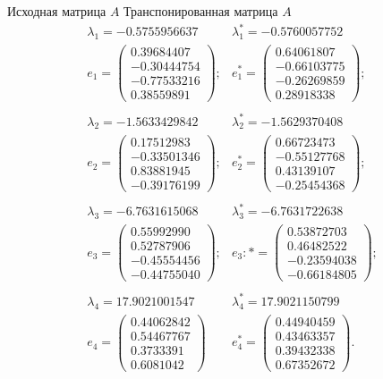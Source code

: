 \documentclass[12pt, a4paper]{article}
\begin{document}
	\newpage
		\qquad \qquad \qquad Исходная матрица $A$ \qquad Транспонированная матрица $A$ 
			\begin{eqnarray*}
			\lambda_1 = -0.5755956637   & \lambda_1^*=-0.5760057752\\
			e_1 = \begin{pmatrix}
				0.39684407\\ -0.30444754\\ -0.77533216\\0.38559891
			\end{pmatrix}; & e_1^* = \begin{pmatrix}
			0.64061807\\-0.66103775\\ -0.26269859\\ 0.28918338
		\end{pmatrix}; \\\\
			\lambda_2 = -1.5633429842  & \lambda_2^*=-1.5629370408\\
			  e_2 = \begin{pmatrix}
				0.17512983\\-0.33501346\\ 0.83881945\\ -0.39176199
			\end{pmatrix}; & e_2^* = \begin{pmatrix}
			0.66723473\\ -0.55127768\\ 0.43139107\\-0.25454368
		\end{pmatrix};\\\\
			\lambda_3 = -6.7631615068 & \lambda_3^* = -6.7631722638\\
			 e_3 = \begin{pmatrix}
				0.55992990	\\ 0.52787906\\-0.45554456\\ -0.44755040
			\end{pmatrix}; & e_3:* = \begin{pmatrix}
			0.53872703\\ 0.46482522\\-0.23594038\\ -0.66184805
		\end{pmatrix};\\\\
			 \lambda_4 = 17.9021001547 & \lambda_4^* = 17.9021150799\\
			  e_4 = \begin{pmatrix}
				0.44062842\\ 0.54467767\\ 0.3733391\\ 0.6081042
			\end{pmatrix} & e_4^* = \begin{pmatrix}
			0.44940459\\ 0.43463357\\ 0.39432338\\ 0.67352672
		\end{pmatrix}.
		\end{eqnarray*}
	\\
\end{document}
